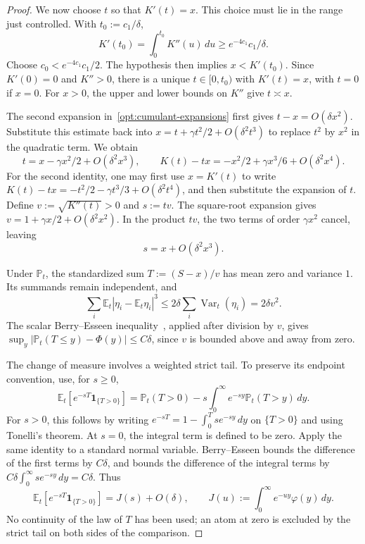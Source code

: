\documentclass[11pt,letterpaper]{article}
\theoremstyle{remark}
\newcommand{\E}{\mathbb E}
\newcommand{\Pp}{\mathbb P}
\newcommand{\Var}{\operatorname{Var}}
\newcommand{\ind}{\mathbf 1}
\begin{document}
\begin{proof}
We now choose $t$ so that $K'(t)=x$. This choice must lie in
the range just controlled. With $t_0:=c_1/\delta$,
\[
 K'(t_0)=\int_0^{t_0}K''(u)\,du
 \ge e^{-4c_1}c_1/\delta.
\]
Choose $c_0<e^{-4c_1}c_1/2$. The hypothesis then implies
$x<K'(t_0)$. Since $K'(0)=0$ and $K''>0$, there is a
unique $t\in[0,t_0)$ with $K'(t)=x$, with $t=0$ if $x=0$.
For $x>0$, the upper and lower bounds on $K''$ give
$t\asymp x$.

The second expansion in~\eqref{opt:cumulant-expansions} first
gives $t-x=O(\delta x^2)$. Substitute this estimate back into
$x=t+\gamma t^2/2+O(\delta^2t^3)$ to replace $t^2$ by $x^2$
in the quadratic term. We obtain
\begin{equation}
 t=x-\gamma x^2/2+O(\delta^2x^3),\qquad
 K(t)-tx=-x^2/2+\gamma x^3/6+O(\delta^2x^4).
 \label{opt:tilt-root}
\end{equation}
For the second identity, one may first use $x=K'(t)$ to write
$K(t)-tx=-t^2/2-\gamma t^3/3+O(\delta^2t^4)$, and then
substitute the expansion of $t$.
Define $v:=\sqrt{K''(t)}>0$ and $s:=tv$. The square-root
expansion gives $v=1+\gamma x/2+O(\delta^2x^2)$.
In the product $tv$, the two terms of order $\gamma x^2$
cancel, leaving
\begin{equation}
 s=x+O(\delta^2x^3).
 \label{opt:tilted-scale}
\end{equation}

Under $\Pp_t$, the standardized sum $T:=(S-x)/v$ has mean
zero and variance $1$. Its summands remain independent, and
\[
 \sum_i\E_t|\eta_i-\E_t\eta_i|^3
 \le2\delta\sum_i\Var_t(\eta_i)=2\delta v^2.
\]
The scalar Berry--Esseen inequality~\cite{Berry1941}, applied
after division by $v$, gives
$\sup_y|\Pp_t(T\le y)-\Phi(y)|\le C\delta$, since $v$
is bounded above and away from zero.

The change of measure involves a weighted strict tail. To preserve
its endpoint convention, use, for $s\ge0$,
\[
 \E_t[e^{-sT}\ind_{\{T>0\}}]
 =\Pp_t(T>0)-s\int_0^\infty e^{-sy}\Pp_t(T>y)\,dy.
\]
For $s>0$, this follows by writing
$e^{-sT}=1-\int_0^T se^{-sy}\,dy$ on $\{T>0\}$ and using
Tonelli's theorem. At $s=0$, the integral term is defined to be
zero. Apply the same identity to a standard normal variable.
Berry--Esseen bounds the difference of the first terms by
$C\delta$, and bounds the difference of the integral terms by
$C\delta\int_0^\infty se^{-sy}\,dy=C\delta$. Thus
\begin{equation}
 \E_t[e^{-sT}\ind_{\{T>0\}}]=J(s)+O(\delta),\qquad
 J(u):=\int_0^\infty e^{-uy}\varphi(y)\,dy.
 \label{opt:strict-tail}
\end{equation}
No continuity of the law of $T$ has been used; an atom at zero
is excluded by the strict tail on both sides of the comparison.


\end{proof}
\end{document}
